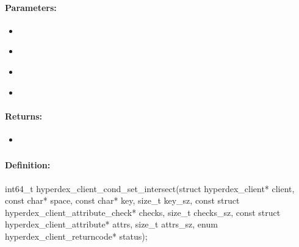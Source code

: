 \paragraph{Parameters:}
\begin{itemize}[noitemsep]
\item {}\\

\item {}\\

\item {}\\

\item {}\\

\end{itemize}

\paragraph{Returns:}
\begin{itemize}[noitemsep]
\item {}\\

\end{itemize}

\pagebreak
\subsubsection{}
\label{api:c:cond_set_intersect}


\paragraph{Definition:}
\begin{ccode}
int64_t hyperdex_client_cond_set_intersect(struct hyperdex_client* client,
        const char* space,
        const char* key, size_t key_sz,
        const struct hyperdex_client_attribute_check* checks, size_t checks_sz,
        const struct hyperdex_client_attribute* attrs, size_t attrs_sz,
        enum hyperdex_client_returncode* status);
\end{ccode}

